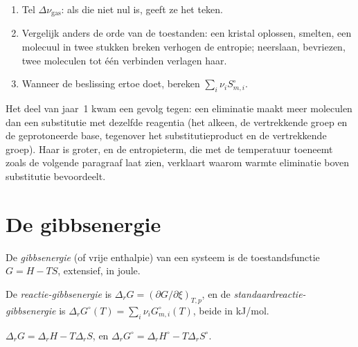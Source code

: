\begin{method}\label{met:b2:reaction-free-energy:entropy-sign}
\begin{enumerate}
  \item Tel $\Delta\nu_{\text{gas}}$: als die niet nul is, geeft ze het
        teken.
  \item Vergelijk anders de orde van de toestanden: een kristal oplossen,
        smelten, een molecuul in twee stukken breken verhogen de entropie;
        neerslaan, bevriezen, twee moleculen tot één verbinden verlagen haar.
  \item Wanneer de beslissing ertoe doet, bereken $\sum_i\nu_iS^\circ_{m,i}$.
\end{enumerate}
\end{method}

Het deel van jaar~1 kwam een gevolg tegen: een eliminatie maakt meer moleculen
dan een substitutie met dezelfde reagentia (het alkeen, de vertrekkende groep
en de geprotoneerde base, tegenover het substitutieproduct en de vertrekkende
groep). Haar  is groter, en de entropieterm, die met de temperatuur
toeneemt zoals de volgende paragraaf laat zien, verklaart waarom warmte
eliminatie boven substitutie bevoordeelt.

\section{De gibbsenergie}

\begin{definition}[Gibbsenergie]\label{def:b2:reaction-free-energy:gibbs-energy}
De \emph{gibbsenergie} (of vrije enthalpie) van een systeem
is de toestandsfunctie $G = H - TS$, extensief, in joule.
\end{definition}

\begin{definition}\label{def:b2:reaction-free-energy:reaction-gibbs}
De \emph{reactie-gibbsenergie} is $\Delta_r G
= (\partial G/\partial\xi)_{T,p}$, en de
\emph{standaardreactie-gibbsenergie} is $\Delta_r G^\circ(T) =
\sum_i\nu_iG^\circ_{m,i}(T)$, beide in \unit{kJ/mol}.
\end{definition}

\begin{proposition}\label{prop:b2:reaction-free-energy:g-h-s}
$\Delta_r G = \Delta_r H - T\Delta_r S$, en $\Delta_r G^\circ = \Delta_r
H^\circ - T\Delta_r S^\circ$.
\end{proposition}

